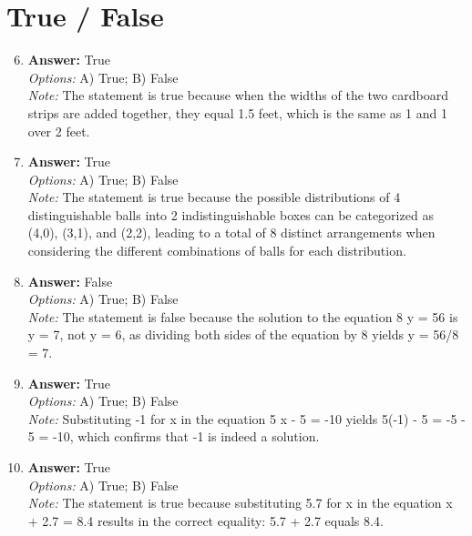 \documentclass[12pt]{article}
\begin{document}
\section*{True / False}
\begin{enumerate}[label=\arabic*.]
\setcounter{enumi}{5}
\item \textbf{Answer:} True
\\ \textit{Options:} A) True; B) False
\\ \textit{Note:} The statement is true because when the widths of the two cardboard strips are added together, they equal 1.5 feet, which is the same as 1 and 1 over 2 feet.
\item \textbf{Answer:} True
\\ \textit{Options:} A) True; B) False
\\ \textit{Note:} The statement is true because the possible distributions of 4 distinguishable balls into 2 indistinguishable boxes can be categorized as (4,0), (3,1), and (2,2), leading to a total of 8 distinct arrangements when considering the different combinations of balls for each distribution.
\item \textbf{Answer:} False
\\ \textit{Options:} A) True; B) False
\\ \textit{Note:} The statement is false because the solution to the equation 8 y = 56 is y = 7, not y = 6, as dividing both sides of the equation by 8 yields y = 56/8 = 7.
\item \textbf{Answer:} True
\\ \textit{Options:} A) True; B) False
\\ \textit{Note:} Substituting -1 for x in the equation 5 x - 5 = -10 yields 5(-1) - 5 = -5 - 5 = -10, which confirms that -1 is indeed a solution.
\item \textbf{Answer:} True
\\ \textit{Options:} A) True; B) False
\\ \textit{Note:} The statement is true because substituting 5.7 for x in the equation x + 2.7 = 8.4 results in the correct equality: 5.7 + 2.7 equals 8.4.
\end{enumerate}
\end{document}
